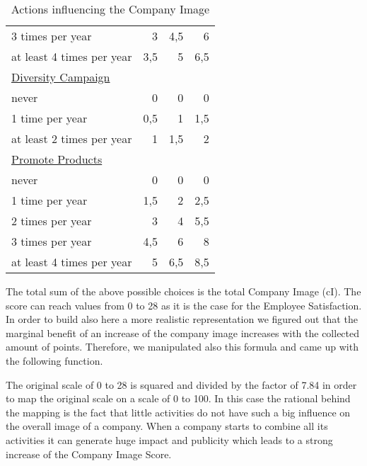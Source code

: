 \begin{table}[]
\begin{tabular}{|l|r|r|r|}
3 times per year                  & 3    & 4,5    & 6 \\
at least 4 times per year         & 3,5  & 5      & 6,5  \\
\underline{Diversity Campaign}    & & & \\
never                             & 0    & 0      & 0 \\
1 time per year                   & 0,5  & 1      & 1,5  \\
at least 2 times per year         & 1    & 1,5    & 2 \\
\underline{Promote Products} & & & \\
never                             & 0    & 0      & 0 \\
1 time per year                   & 1,5  & 2      & 2,5  \\
2 times per year                  & 3    & 4      & 5,5  \\
3 times per year                  & 4,5  & 6      & 8 \\
at least 4 times per year         & 5    & 6,5    & 8,5  \\
\hline
\end{tabular}
\caption{Actions influencing the Company Image}
\label{calculation_CI}
\end{table}

The total sum of the above possible choices is the total Company Image (\gls{cI}). The score can reach values from 0 to 28 as it is the case for the Employee Satisfaction. In order to build also here a more realistic representation we figured out that the marginal benefit of an increase of the company image increases with the collected amount of points. Therefore, we manipulated also this formula and came up with the following function.


The original scale of 0 to 28 is squared and divided by the factor of 7.84 in order to map the original scale on a scale of 0 to 100. In this case the rational behind the mapping is the fact that little activities do not have such  a big influence on the overall image of a company. When a company starts to combine all its activities it can generate huge impact and publicity which leads to a strong increase of the Company Image Score.